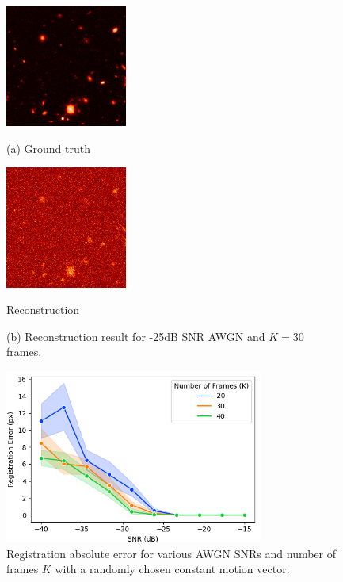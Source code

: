 \documentclass{article}
\begin{document}
\begin{figure}[htb]
\begin{minipage}[b]{.48\linewidth}
  \centering
  \centerline{\includegraphics[width=4.0cm]{images/recon_clean.png}}
  \centerline{(a) Ground truth}\medskip
\end{minipage}
\hfill
\begin{minipage}[b]{0.48\linewidth}
  \centering
  \centerline{\includegraphics[width=4.0cm]{images/recon.png}}
  \centerline{Reconstruction}\medskip
\end{minipage}
  \caption{(b) Reconstruction result for -25dB SNR AWGN and $K=30$ frames.}
\label{fig:recon}
\end{figure}

\begin{figure}[htb]
  \begin{minipage}[b]{1\linewidth}
    \centering
    \centerline{\includegraphics[width=8.5cm]{images/db_sweep.png}}
  \end{minipage}
  \caption{Registration absolute error for various AWGN SNRs and number of frames $K$ with a randomly chosen constant motion vector.}
  \label{fig:db_sweep}
\end{figure}
\end{document}
